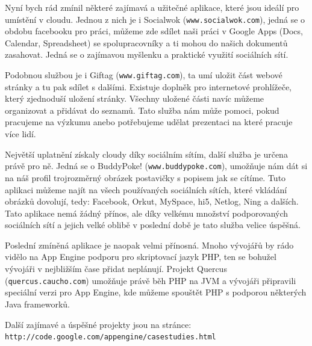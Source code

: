 Nyní bych rád zmínil některé zajímavá a užitečné aplikace, které jsou ideálí pro umístění v cloudu. Jednou z nich je i Socialwok (\verb|www.socialwok.com|), jedná se o obdobu facebooku pro práci, můžeme zde sdílet naši práci v Google Apps (Docs, Calendar, Spreadsheet) se spolupracovníky a ti mohou do našich dokumentů zasahovat. Jedná se o zajímavou myšlenku a praktické využití sociálních sítí.

Podobnou službou je i Giftag (\verb|www.giftag.com|), ta umí uložit část webové stránky a tu pak sdílet s dalšími. Existuje doplněk pro internetové prohlížeče, který zjednoduší uložení stránky. Všechny uložené části navíc můžeme organizovat a přidávat do seznamů. Tato služba nám může pomoci, pokud pracujeme na výzkumu anebo potřebujeme udělat prezentaci na které pracuje více lidí.
 
Největší uplatnění získaly cloudy díky sociálním sítím, další služba je určena právě pro ně. Jedná se o BuddyPoke! (\verb|www.buddypoke.com|), umožňuje nám dát si na náš profil trojrozměrný obrázek postavičky s popisem jak se cítíme. Tuto aplikaci můžeme najít na všech používaných sociálních sítích, které vkládání obrázků dovolují, tedy: Facebook, Orkut, MySpace, hi5, Netlog, Ning a dalších. Tato aplikace nemá žádný přínos, ale díky velkému množství podporovaných sociálních sítí a jejich velké oblibě v poslední době je tato služba velice úspěšná.

Poslední zmíněná aplikace je naopak velmi přínosná. Mnoho vývojářů by rádo vidělo na App Engine podporu pro skriptovací jazyk PHP, ten se bohužel vývojáři v nejbližším čase přidat neplánují. Projekt Quercus (\verb|quercus.caucho.com|) umožňuje právě běh PHP na JVM a vývojáři připravili speciální verzi pro App Engine, kde můžeme spouštět PHP s podporou některých Java frameworků.

Další zajímavé a úspěšné projekty jsou na stránce: \verb|http://code.google.com/appengine/casestudies.html|

